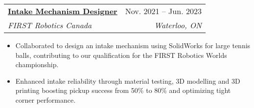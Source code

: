 \documentclass[letterpaper]{article}
\makeatletter
\newcommand{\resumeItem}[1]{
  \item\small{
    {#1 \vspace{-2pt}}
  }
}
\newcommand{\resumeSubheading}[4]{
  \vspace{-2pt}\item
    \begin{tabular*}{0.97\textwidth}[t]{l@{\extracolsep{\fill}}r}
      \textbf{#1} & #2 \\
      \textit{\small#3} & \textit{\small #4} \\
    \end{tabular*}\vspace{-7pt}
}
\newcommand{\resumeItemListStart}{\begin{itemize}}
\newcommand{\resumeItemListEnd}{\end{itemize}\vspace{-5pt}}
\makeatother
\begin{document}
    \resumeSubheading
      {\underline{\href{https://www.gavintranquilino.com/rapid-react.html}{Intake Mechanism Designer}}}{Nov. 2021 -- Jun. 2023}
      {FIRST Robotics Canada}{Waterloo, ON}
      \resumeItemListStart
        \resumeItem{Collaborated to design an intake mechanism using SolidWorks for large tennis balls, contributing to our qualification for the FIRST Robotics Worlds championship.}
        \resumeItem{Enhanced intake reliability through material testing, 3D modelling and 3D printing boosting pickup success from 50\% to 80\% and optimizing tight corner performance.}
      \resumeItemListEnd


\end{document}
